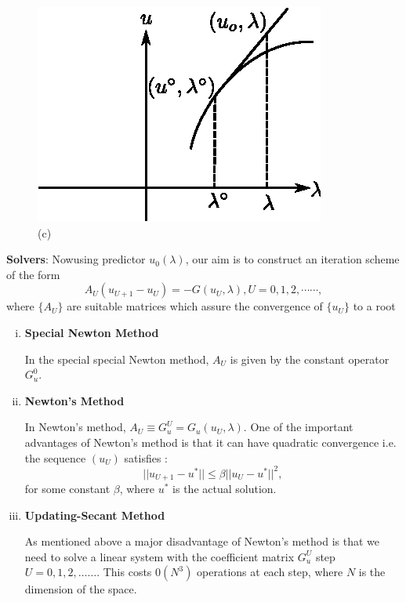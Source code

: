 \setcounter{figure}{3}
\begin{figure}[H]
\centering
\includegraphics{vol79-fig/fig79-18.eps}
\smallskip
\caption{(c)}
\label{chap2-fig2.4c}
\end{figure}

\noindent
\textbf{Solvers}: Now\pageoriginale using predictor $u_0(\lambda )$,
our aim is to 
construct an iteration scheme of the form  
$$
A_U (u_{U+1} - u_U) = - G(u_U, \lambda ), U = 0,1,2, \cdots \cdots ,  
$$
where $\{A_U\}$ are suitable matrices which assure the convergence of
$\{u_U\}$ to a root 
\begin{enumerate}[(i)]
\item {\bf Special Newton Method}  

In the special special Newton method, $A_U$ is given by the constant
operator $G^0_u$. 
 
 \item {\bf Newton's Method}
 
 In Newton's method, $A_U \equiv G^U_u = G_u(u_U, \lambda )$. One of
 the important advantages of Newton's method is that it can have
 quadratic convergence i.e. the sequence $(u_U)$ satisfies : 
 $$
 || u_{U+1} -u^*  || \leq \beta || u_U - u^*  ||^2, 
 $$ 
 for some constant $\beta$, where $u^*$ is the actual solution.
 

 \item {\bf Updating-Secant Method}

 As mentioned above a major disadvantage of Newton's method is that
 we need to solve a linear system with the coefficient matrix $G^U_u$
 step $U = 0,1,2, \ldots \ldots$. This costs $0(N^3)$ operations at
 each step, where $N$ is the dimension of the space. 
 \end{enumerate}
 
